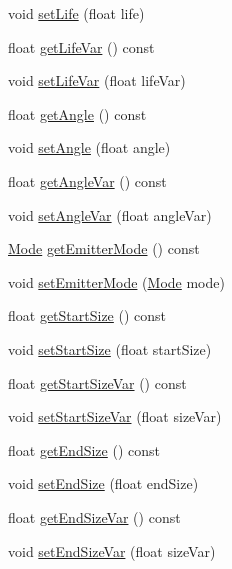 \begin{DoxyCompactItemize}
\item 
void \hyperlink{classParticleSystem_ac5569a6291b2920b54b64340c14c5db9}{set\+Life} (float life)
\item 
float \hyperlink{classParticleSystem_ad069de64232bddbb3d647dda45ebbe33}{get\+Life\+Var} () const
\item 
void \hyperlink{classParticleSystem_a3c33373f28ce8a61fef7526d33ca052d}{set\+Life\+Var} (float life\+Var)
\item 
float \hyperlink{classParticleSystem_a0dbc31c17a275c2e97ce9734e41c4b4d}{get\+Angle} () const
\item 
void \hyperlink{classParticleSystem_aa935e74f8382d39d6c749265711b3c00}{set\+Angle} (float angle)
\item 
float \hyperlink{classParticleSystem_af95b74099e813301356d9de950c65b4b}{get\+Angle\+Var} () const
\item 
void \hyperlink{classParticleSystem_af523f33ff9f61ff84e0f807e90aca456}{set\+Angle\+Var} (float angle\+Var)
\item 
\hyperlink{classParticleSystem_aa380bd1c6062c44d56268a61ade9c8fb}{Mode} \hyperlink{classParticleSystem_aa2fb0ce7062690746cd376dcddaac3bb}{get\+Emitter\+Mode} () const
\item 
void \hyperlink{classParticleSystem_aeac528ed49a4782003bf21aeb5e321d4}{set\+Emitter\+Mode} (\hyperlink{classParticleSystem_aa380bd1c6062c44d56268a61ade9c8fb}{Mode} mode)
\item 
float \hyperlink{classParticleSystem_a31d1b7bd256455093c2edd2a560c9684}{get\+Start\+Size} () const
\item 
void \hyperlink{classParticleSystem_a4a45431269256ddc1240da2771bdbd51}{set\+Start\+Size} (float start\+Size)
\item 
float \hyperlink{classParticleSystem_a1269b84f6f3b4355fb2df725ff1131f3}{get\+Start\+Size\+Var} () const
\item 
void \hyperlink{classParticleSystem_a9f7ee2a4e5ae1f3b9b47a854a6e2fc2a}{set\+Start\+Size\+Var} (float size\+Var)
\item 
float \hyperlink{classParticleSystem_a8366ad864f3b29ad8fd0f436934cad9e}{get\+End\+Size} () const
\item 
void \hyperlink{classParticleSystem_a729cc59e5e16918782be7a2892d0d4e5}{set\+End\+Size} (float end\+Size)
\item 
float \hyperlink{classParticleSystem_a04a3e0ed99bafaeea93fc41f92c82257}{get\+End\+Size\+Var} () const
\item 
void \hyperlink{classParticleSystem_a33f6f3a8ef14fd2d6c9f7b0306d3fccc}{set\+End\+Size\+Var} (float size\+Var)

\end{DoxyCompactItemize}
